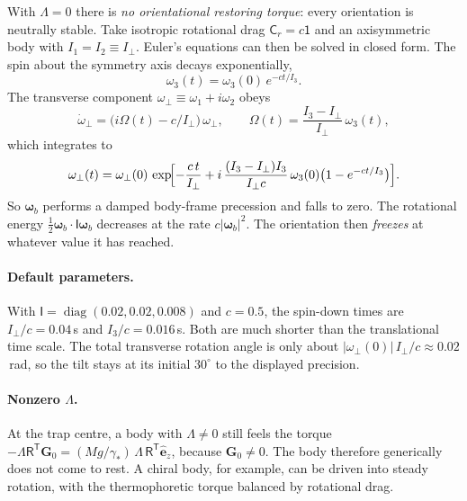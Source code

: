 \documentclass[11pt]{article}
\newcommand{\vect}[1]{\bm{#1}}
\newcommand{\tens}[1]{\mathsf{#1}}
\newcommand{\ez}{\hat{\vect{e}}_z}
\newcommand{\Rm}{\tens{R}}
\newcommand{\Gl}{\vect{G}}
\newcommand{\T}{^{\mathsf{T}}}
\theoremstyle{remark}
\begin{document}
With $\tens{\Lambda}=0$ there is \emph{no orientational restoring torque}:
every orientation is neutrally stable. Take isotropic rotational drag
$\tens{C}_r=c\tens{1}$ and an axisymmetric body with
$I_1=I_2\equiv I_\perp$. Euler's equations can then be solved in closed
form. The spin about the symmetry axis decays exponentially,
\begin{equation}
  \omega_3(t) = \omega_3(0)\,e^{-ct/I_3}.
\end{equation}
The transverse component $\omega_\perp\equiv\omega_1+i\omega_2$ obeys
\begin{equation}
  \dot\omega_\perp = \bigl(i\Omega(t) - c/I_\perp\bigr)\,\omega_\perp,
  \qquad
  \Omega(t) = \frac{I_3-I_\perp}{I_\perp}\,\omega_3(t),
\end{equation}
which integrates to
\begin{equation}
  \omega_\perp(t) = \omega_\perp(0)\,
  \exp\!\Bigl[-\frac{c\,t}{I_\perp}
  + i\,\frac{(I_3-I_\perp)I_3}{I_\perp c}\,\omega_3(0)\bigl(1-e^{-ct/I_3}\bigr)\Bigr].
\end{equation}
So $\vect{\omega}_b$ performs a damped body-frame precession and falls to
zero. The rotational energy $\tfrac12\vect{\omega}_b\cdot\tens{I}\vect{\omega}_b$
decreases at the rate $c|\vect{\omega}_b|^2$. The orientation then
\emph{freezes} at whatever value it has reached.

\paragraph{Default parameters.} With $\tens{I}=\operatorname{diag}(0.02,0.02,0.008)$
and $c=0.5$, the spin-down times are $I_\perp/c=0.04$\,s and $I_3/c=0.016$\,s.
Both are much shorter than the translational time scale. The total
transverse rotation angle is only about $|\omega_\perp(0)|\,I_\perp/c\approx0.02$\,rad,
so the tilt stays at its initial $30^\circ$ to the displayed precision.

\paragraph{Nonzero $\tens{\Lambda}$.} At the trap centre, a body with
$\tens{\Lambda}\neq0$ still feels the torque
$-\tens{\Lambda}\Rm\T\Gl_0 = (Mg/\gamma_\ast)\,\tens{\Lambda}\,\Rm\T\ez$,
because $\Gl_0\neq0$. The body therefore generically does not come to
rest. A chiral body, for example, can be driven into steady rotation, with
the thermophoretic torque balanced by rotational drag.

\end{document}
